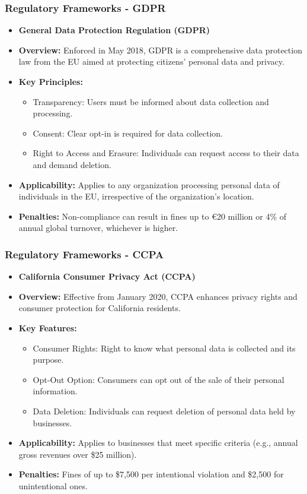 \documentclass[aspectratio=169]{beamer}
\begin{document}
\begin{frame}[fragile]
    \frametitle{Regulatory Frameworks - GDPR}
    \begin{itemize}
        \item \textbf{General Data Protection Regulation (GDPR)}
        \item \textbf{Overview:} Enforced in May 2018, GDPR is a comprehensive data protection law from the EU aimed at protecting citizens' personal data and privacy.
        
        \item \textbf{Key Principles:}
        \begin{itemize}
            \item Transparency: Users must be informed about data collection and processing.
            \item Consent: Clear opt-in is required for data collection.
            \item Right to Access and Erasure: Individuals can request access to their data and demand deletion.
        \end{itemize}

        \item \textbf{Applicability:} Applies to any organization processing personal data of individuals in the EU, irrespective of the organization's location.
        \item \textbf{Penalties:} Non-compliance can result in fines up to €20 million or 4\% of annual global turnover, whichever is higher.
    \end{itemize}
\end{frame}

\begin{frame}[fragile]
    \frametitle{Regulatory Frameworks - CCPA}
    \begin{itemize}
        \item \textbf{California Consumer Privacy Act (CCPA)}
        \item \textbf{Overview:} Effective from January 2020, CCPA enhances privacy rights and consumer protection for California residents.
        
        \item \textbf{Key Features:}
        \begin{itemize}
            \item Consumer Rights: Right to know what personal data is collected and its purpose.
            \item Opt-Out Option: Consumers can opt out of the sale of their personal information.
            \item Data Deletion: Individuals can request deletion of personal data held by businesses.
        \end{itemize} 

        \item \textbf{Applicability:} Applies to businesses that meet specific criteria (e.g., annual gross revenues over \$25 million).
        \item \textbf{Penalties:} Fines of up to \$7,500 per intentional violation and \$2,500 for unintentional ones. 
    \end{itemize}
\end{frame}
\end{document}
